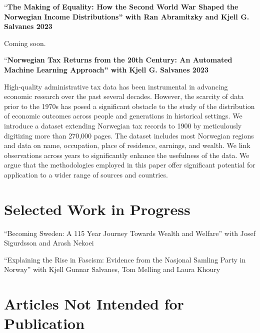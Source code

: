 \documentclass[11pt,]{article}
\begin{document}
``\textbf{The Making of Equality: How the Second World War Shaped the
Norwegian Income Distributions'' with Ran Abramitzky and Kjell G.
Salvanes \hfill 2023}

Coming soon.\vspace{0.3cm}\vspace{-0.2cm}

``\textbf{Norwegian Tax Returns from the 20th Century: An Automated
Machine Learning Approach'' with Kjell G. Salvanes \hfill 2023}

High-quality administrative tax data has been instrumental in advancing
economic research over the past several decades. However, the scarcity
of data prior to the 1970s has posed a significant obstacle to the study
of the distribution of economic outcomes across people and generations
in historical settings. We introduce a dataset extending Norwegian tax
records to 1900 by meticulously digitizing more than 270,000 pages. The
dataset includes most Norwegian regions and data on name, occupation,
place of residence, earnings, and wealth. We link observations across
years to significantly enhance the usefulness of the data. We argue that
the methodologies employed in this paper offer significant potential for
application to a wider range of sources and
countries.\vspace{0.3cm}\vspace{-0.2cm}

\vspace{0.5cm}

\hypertarget{selected-work-in-progress}{%
\section{Selected Work in Progress}\label{selected-work-in-progress}}

``Becoming Sweden: A 115 Year Journey Towards Wealth and Welfare'' with
Josef Sigurdsson and Arash Nekoei\vspace{-0.2cm}

``Explaining the Rise in Fascism: Evidence from the Nasjonal Samling
Party in Norway'' with Kjell Gunnar Salvanes, Tom Melling and Laura
Khoury\vspace{-0.2cm}

\vspace{0.5cm}

\hypertarget{articles-not-intended-for-publication}{%
\section{Articles Not Intended for
Publication}\label{articles-not-intended-for-publication}}
\end{document}
